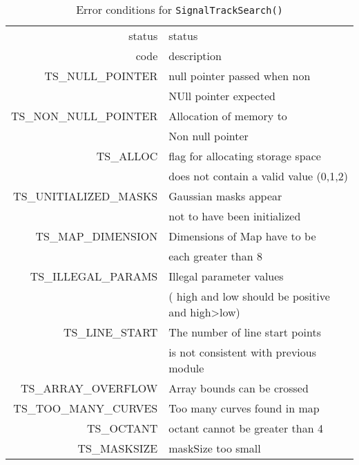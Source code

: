 \begin{table}

\hoffset -1.7in

\begin{tabular}{|r|l|}\hline
status&	status\\
code&	description\\\hline
TS\_NULL\_POINTER&null pointer passed when non \\
&NUll pointer expected\\
TS\_NON\_NULL\_POINTER&Allocation of memory to\\
& Non null pointer\\
TS\_ALLOC&flag for allocating storage space \\
&does not contain a valid
value (0,1,2)\\
TS\_UNITIALIZED\_MASKS&Gaussian masks appear \\
&not to have been initialized\\
TS\_MAP\_DIMENSION&Dimensions of Map have to be\\
& each greater than 8\\
TS\_ILLEGAL\_PARAMS&Illegal parameter values \\
&( high and low should be positive and high>low)\\
TS\_LINE\_START&The number of line start points \\
&is not consistent with previous module\\
TS\_ARRAY\_OVERFLOW&Array bounds can be crossed\\ 
TS\_TOO\_MANY\_CURVES&Too many curves found in map\\
TS\_OCTANT&octant cannot be greater than 4\\
TS\_MASKSIZE&maskSize too small\\
\hline
\end{tabular}
\caption{Error conditions for {\tt SignalTrackSearch()\/}}
\label{t:errors}
\end{table}                             
